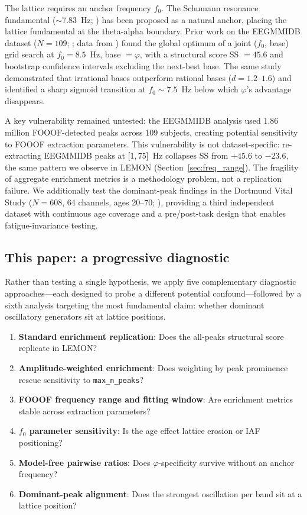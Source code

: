 \documentclass[11pt,a4paper]{article}
\newcommand{\phisym}{\varphi}
\newcommand{\fzero}{f_0}
\begin{document}
The lattice requires an anchor frequency $\fzero$. The Schumann resonance fundamental ($\sim$7.83~Hz; \cite{Nickolaenko2014}) has been proposed as a natural anchor, placing the lattice fundamental at the theta-alpha boundary. Prior work on the EEGMMIDB dataset ($N = 109$; \cite{Lacy2026paper2}; data from \cite{Schalk2004, Goldberger2000}) found the global optimum of a joint ($\fzero$, base) grid search at $\fzero = 8.5$~Hz, base $= \phisym$, with a structural score SS $= 45.6$ and bootstrap confidence intervals excluding the next-best base. The same study demonstrated that irrational bases outperform rational bases ($d = 1.2$--$1.6$) and identified a sharp sigmoid transition at $\fzero \sim 7.5$~Hz below which $\phisym$'s advantage disappears.

A key vulnerability remained untested: the EEGMMIDB analysis used 1.86 million FOOOF-detected peaks across 109 subjects, creating potential sensitivity to FOOOF extraction parameters. This vulnerability is not dataset-specific: re-extracting EEGMMIDB peaks at [1,\,75]~Hz collapses SS from $+45.6$ to $-23.6$, the same pattern we observe in LEMON (Section~\ref{sec:freq_range}). The fragility of aggregate enrichment metrics is a methodology problem, not a replication failure. We additionally test the dominant-peak findings in the Dortmund Vital Study ($N = 608$, 64 channels, ages 20--70; \cite{GudiMindermann2024}), providing a third independent dataset with continuous age coverage and a pre/post-task design that enables fatigue-invariance testing.

\subsection{This paper: a progressive diagnostic}

Rather than testing a single hypothesis, we apply five complementary diagnostic approaches---each designed to probe a different potential confound---followed by a sixth analysis targeting the most fundamental claim: whether dominant oscillatory generators sit at lattice positions.

\begin{enumerate}
    \item \textbf{Standard enrichment replication}: Does the all-peaks structural score replicate in LEMON?
    \item \textbf{Amplitude-weighted enrichment}: Does weighting by peak prominence rescue sensitivity to \texttt{max\_n\_peaks}?
    \item \textbf{FOOOF frequency range and fitting window}: Are enrichment metrics stable across extraction parameters?
    \item \textbf{$\fzero$ parameter sensitivity}: Is the age effect lattice erosion or IAF positioning?
    \item \textbf{Model-free pairwise ratios}: Does $\phisym$-specificity survive without an anchor frequency?
    \item \textbf{Dominant-peak alignment}: Does the strongest oscillation per band sit at a lattice position?
\end{enumerate}
\end{document}
